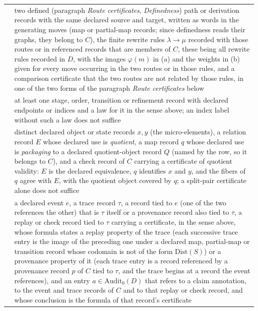 \begin{center}
\begin{tabularx}{\linewidth}{@{}l>{\raggedright\arraybackslash}X@{}}
\Pthree{} & two defined (paragraph \emph{Route certificates}, \emph{Definedness}) path or derivation records with the same declared source and target, written as words in the generating moves (map or partial-map records; since definedness reads their graphs, they belong to \(C\)), the finite rewrite rules \(\lambda\to\mu\) recorded with those routes or in referenced records that are members of \(C\), these being all rewrite rules recorded in \(D\), with the images \(\varphi(m)\) in (a) and the weights in (b) given for every move occurring in the two routes or in those rules, and a comparison certificate that the two routes are not related by those rules, in one of the two forms of the paragraph \emph{Route certificates} below \\
\Pfour{} & at least one stage, order, transition or refinement record with declared endpoints or indices and a law for it in the sense above; an index label without such a law does not suffice \\
\Pfive{} & distinct declared object or state records \(x,y\) (the micro-elements), a relation record \(E\) whose declared use is \emph{quotient}, a map record \(q\) whose declared use is \emph{packaging} to a declared quotient-object record \(Q\) (named by the row, so it belongs to \(C\)), and a check record of \(C\) carrying a certificate of quotient validity: \(E\) is the declared equivalence, \(q\) identifies \(x\) and \(y\), and the fibers of \(q\) agree with \(E\), with the quotient object covered by \(q\); a \Pone{} split-pair certificate alone does not suffice \\
\Psix{} & a declared event \(e\), a trace record \(\tau\), a record tied to \(e\) (one of the two references the other) that is \(\tau\) itself or a provenance record also tied to \(\tau\), a replay or check record tied to \(\tau\) carrying a certificate, in the sense above, whose formula states a replay property of the trace (each successive trace entry is the image of the preceding one under a declared map, partial-map or transition record whose codomain is not of the form \(\mathrm{Dist}(S)\)) or a provenance property of it (each trace entry is a record referenced by a provenance record \(p\) of \(C\) tied to \(\tau\), and the trace begins at a record the event references), and an entry \(a\in\mathrm{Audit}_0(D)\) that refers to a claim annotation, to the event and trace records of \(C\) and to that replay or check record, and whose conclusion is the formula of that record's certificate \\
\bottomrule
\end{tabularx}
\label{tab:witness-types}
\end{center}

